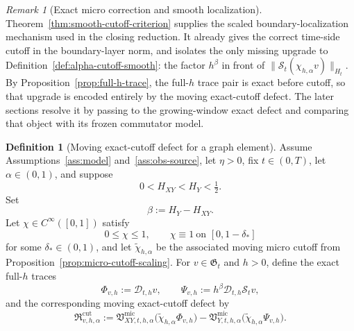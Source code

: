 \documentclass[11pt,a4paper]{amsart}
\theoremstyle{plain}
\theoremstyle{definition}
\newtheorem{definition}[theorem]{Definition}
\theoremstyle{remark}
\newtheorem{remark}[theorem]{Remark}
\begin{document}
\begin{remark}[Exact micro correction and smooth localization]
\label{rem:smooth-cutoff-criterion}
Theorem~\ref{thm:smooth-cutoff-criterion} supplies the scaled boundary-localization mechanism used
in the closing reduction. It already gives the correct time-side cutoff in the boundary-layer norm, and isolates
the only missing upgrade to Definition~\ref{def:alpha-cutoff-smooth}: the factor \(h^\beta\) in
front of \(\|\mathcal S_t(\chi_{h,\alpha}v)\|_{H_t}\). By Proposition~\ref{prop:full-h-trace}, the
full-\(h\) trace pair is exact before cutoff, so that upgrade is encoded entirely by the moving
exact-cutoff defect. The later sections resolve it by passing to the growing-window exact defect and
comparing that object with its frozen commutator model.
\end{remark}

\begin{definition}[Moving exact-cutoff defect for a graph element]
\label{def:moving-cutoff-defect}
Assume Assumptions~\ref{ass:model} and~\ref{ass:obs-source}, let \(\eta>0\), fix \(t\in(0,T)\),
let \(\alpha\in(0,1)\), and suppose
\[
0<H_{XY}<H_Y<\tfrac12.
\]
Set
\[
\beta:=H_Y-H_{XY}.
\]
Let \(\chi\in C^\infty([0,1])\) satisfy
\[
0\le \chi\le1,
\qquad
\chi\equiv1\ \text{on }[0,1-\delta_*]
\]
for some \(\delta_*\in(0,1)\), and let \(\widetilde\chi_{h,\alpha}\) be the associated moving micro
cutoff from Proposition~\ref{prop:micro-cutoff-scaling}. For \(v\in\mathfrak G_t\) and \(h>0\),
define the exact full-\(h\) traces
\[
\Phi_{v,h}:=\mathcal D_{t,h}v,
\qquad
\Psi_{v,h}:=h^\beta\mathcal D_{t,h}\mathcal S_t v,
\]
and the corresponding moving exact-cutoff defect by
\begin{equation}\label{eq:moving-cutoff-defect}
\mathfrak R_{v,h,\alpha}^{\mathrm{cut}}
:=
\mathfrak V_{XY,t,h,\alpha}^{\mathrm{mic}}
\bigl(
\widetilde\chi_{h,\alpha}\Phi_{v,h}
\bigr)
-
\mathfrak V_{Y,t,h,\alpha}^{\mathrm{mic}}
\bigl(
\widetilde\chi_{h,\alpha}\Psi_{v,h}
\bigr).
\end{equation}
\end{definition}
\end{document}
